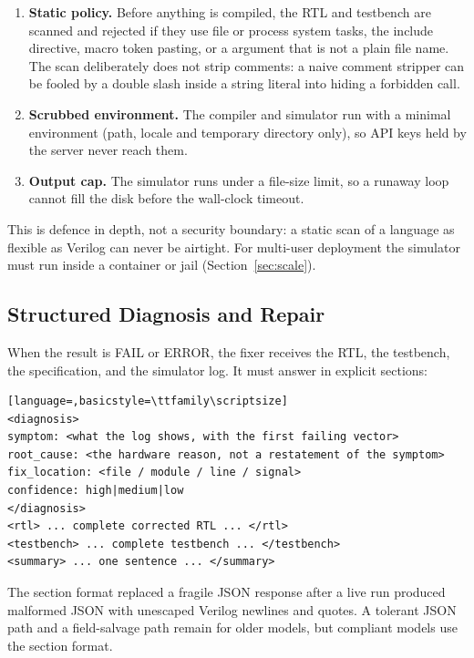 \documentclass[11pt,a4paper]{article}
\newcommand{\code}[1]{\texttt{\detokenize{#1}}}
\begin{document}
\begin{enumerate}[label=\textbf{\arabic*.}]
\item \textbf{Static policy.} Before anything is compiled, the RTL and testbench are scanned and rejected if they use file or process system tasks, the include directive, macro token pasting, or a \code{$dumpfile} argument that is not a plain file name. The scan deliberately does not strip comments: a naive comment stripper can be fooled by a double slash inside a string literal into hiding a forbidden call.
\item \textbf{Scrubbed environment.} The compiler and simulator run with a minimal environment (path, locale and temporary directory only), so API keys held by the server never reach them.
\item \textbf{Output cap.} The simulator runs under a file-size limit, so a runaway \code{$display} loop cannot fill the disk before the wall-clock timeout.
\end{enumerate}

This is defence in depth, not a security boundary: a static scan of a language as flexible as Verilog can never be airtight. For multi-user deployment the simulator must run inside a container or jail (Section~\ref{sec:scale}).

\subsection{Structured Diagnosis and Repair}
\label{sec:loop}
When the result is FAIL or ERROR, the fixer receives the RTL, the testbench, the
specification, and the simulator log. It must answer in explicit sections:

\begin{lstlisting}[language=,basicstyle=\ttfamily\scriptsize]
<diagnosis>
symptom: <what the log shows, with the first failing vector>
root_cause: <the hardware reason, not a restatement of the symptom>
fix_location: <file / module / line / signal>
confidence: high|medium|low
</diagnosis>
<rtl> ... complete corrected RTL ... </rtl>
<testbench> ... complete testbench ... </testbench>
<summary> ... one sentence ... </summary>
\end{lstlisting}

The section format replaced a fragile JSON response after a live run produced
malformed JSON with unescaped Verilog newlines and quotes. A tolerant JSON path and
a field-salvage path remain for older models, but compliant models use the section
format.
\end{document}
